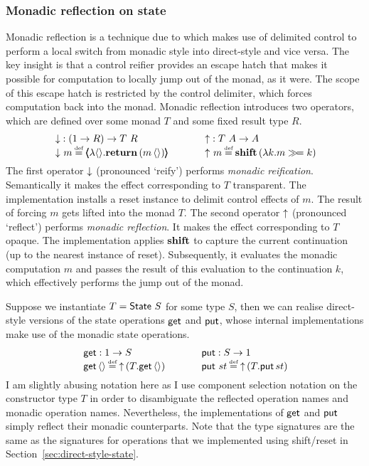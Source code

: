 \documentclass[12pt,phd,lfcs,twoside,openright,logo,leftchapter,normalheadings]{infthesis}
\theoremstyle{plain}
\theoremstyle{definition}
\begin{document}
\subsubsection{Monadic reflection on state}
%
Monadic reflection is a technique due to
\citet{Filinski94,Filinski96,Filinski99,Filinski10} which makes use of
delimited control to perform a local switch from monadic style into
direct-style and vice versa. The key insight is that a control reifier
provides an escape hatch that makes it possible for computation to
locally jump out of the monad, as it were. The scope of this escape
hatch is restricted by the control delimiter, which forces computation
back into the monad. Monadic reflection introduces two operators,
which are defined over some monad $T$ and some fixed result type $R$.
%
\[
    \ba{@{~}l@{\qquad\quad}@{~}r}
      \multirow{2}{*}{
        \bl
         \reify : (\UnitType \to R) \to T~R\\
         \reify~m \defas \reset{\lambda\Unit. \Return\,(m\,\Unit)}
        \el} &
      \multirow{2}{*}{
        \bl
          \reflect : T~A \to A\\
          \reflect~m \defas \shift\,(\lambda k.m \bind k)
          \el} \\ & %
    \ea
\]
%
The first operator $\mathord{\downarrow}$ (pronounced `reify') performs
\emph{monadic reification}. Semantically it makes the effect
corresponding to $T$ transparent. The implementation installs a reset
instance to delimit control effects of $m$. The result of forcing $m$
gets lifted into the monad $T$.
%
The second operator $\mathord{\uparrow}$ (pronounced `reflect') performs
\emph{monadic reflection}. It makes the effect corresponding to $T$
opaque. The implementation applies $\mathbf{shift}$ to capture the current
continuation (up to the nearest instance of reset). Subsequently, it
evaluates the monadic computation $m$ and passes the result of this
evaluation to the continuation $k$, which effectively performs the
jump out of the monad.


Suppose we instantiate $T = \mathsf{State}~S$ for some type $S$, then we can
realise direct-style versions of the state operations $\mathsf{get}$ and
$\mathsf{put}$, whose internal implementations make use of the monadic state
operations.
%
\[
  \ba{@{~}l@{\qquad\quad}@{~}r}
    \multirow{2}{*}{
      \bl
        \getF : \UnitType \to S\\
        \getF\,\Unit \defas \reflect\,(T.\getF\,\Unit)
      \el} &
    \multirow{2}{*}{
      \bl
        \putF : S \to \UnitType\\
        \putF~st \defas \reflect\,(T.\putF\,st)
      \el} \\ & %
  \ea
\]
%
I am slightly abusing notation here as I use component selection
notation on the constructor type $T$ in order to disambiguate the
reflected operation names and monadic operation names. Nevertheless,
the implementations of $\mathsf{get}$ and $\mathsf{put}$ simply reflect their
monadic counterparts. Note that the type signatures are the same as
the signatures for operations that we implemented using shift/reset in
Section~\ref{sec:direct-style-state}.
\end{document}
